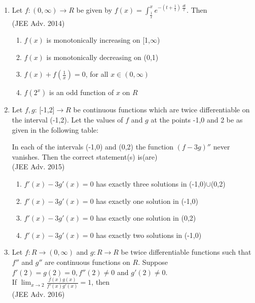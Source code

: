 \documentclass[journal,12pt,twocolumn]{IEEEtran}
\theoremstyle{remark}
\begin{document}
\begin{enumerate}
{        %
        
        }
    \item{
        
            Let $f: (0,\infty)\rightarrow R$ be given by $f(x) = \int_{\frac{1}{x}}^x e^{-(t + \frac{1}{t})\ \frac{dt}{t}}$. Then
            \\ \text{   } \hfill
                {(JEE Adv. 2014)}
            
            \begin{enumerate}
                \item $f(x)$ is monotonically increasing on [1,$\infty$)
                \item $f(x)$ is monotonically decreasing on (0,1)
                \item $f(x) + f(\frac{1}{x}) = 0$, for all $x \in (0,\infty)$
                \item $f(2^x)$ is an odd function of $x$ on $R$ 
            \end{enumerate}
        
        }
    \item{
        
            Let $f,g$: [-1,2]$\rightarrow R$ be continuous functions which are twice differentiable on the interval (-1,2). Let the values of $f$ and $g$ at the points -1,0 and 2 be as given in the following table:
            
            In each of the intervals (-1,0) and (0,2) the function $(f-3g)''$ never vanishes. Then the correct statement(s) is(are)
            \\ \text{   } \hfill
                {(JEE Adv. 2015)}
            
            \begin{enumerate}
                \item $f'(x) - 3g'(x) = 0$ has exactly three solutions in (-1,0)$\cup$(0,2)
                \item $f'(x) - 3g'(x) = 0$ has exactly one solution in (-1,0)
                \item $f'(x) - 3g'(x) = 0$ has exactly one solution in (0,2)
                \item $f'(x) - 3g'(x) = 0$ has exactly two solutions in (-1,0)
            \end{enumerate}
        
        }
    \item{
        
            Let $f: R\rightarrow (0,\infty)$ and $g: R\rightarrow R$ be twice differentiable functions such that $f''$ and $g''$ are continuous functions on $R$. Suppose $f'(2) = g(2)=0, f''(2) \neq0$ and $g'(2)\neq0$.\\[6pt] If $\lim_{x\to2}  \frac{f(x)g(x)}{f'(x)g'(x)} = 1$, then
            \\ \text{   } \hfill
                {(JEE Adv. 2016)}
            
}
\end{enumerate}
\end{document}
